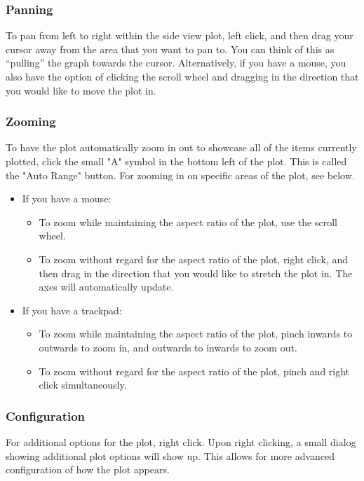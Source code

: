 \documentclass[titlepage]{article}
\begin{document}
	\subsubsection{Panning}
	To pan from left to right within the side view plot, left click, and then drag your cursor away from the area that you want to pan to. You can think of this as “pulling” the graph towards the cursor. Alternatively, if you have a mouse, you also have the option of clicking the scroll wheel and dragging in the direction that you would like to move the plot in.
	
	\subsubsection{Zooming}
	
	To have the plot automatically zoom in out to showcase all of the items currently plotted, click the small "A" symbol in the bottom left of the plot. This is called the "Auto Range" button. For zooming in on specific areas of the plot, see below.
	
	\begin{itemize}
		\item If you have a mouse:
			\begin{itemize}
				\item To zoom while maintaining the aspect ratio of the plot, use the scroll wheel.
				\item To zoom without regard for the aspect ratio of the plot, right click, and then drag in the direction that you would like to stretch the plot in. The axes will automatically update.
			\end{itemize}
	
		\item If you have a trackpad:
			\begin{itemize}
				\item To zoom while maintaining the aspect ratio of the plot, pinch inwards to outwards to zoom in, and outwards to inwards to zoom out.
				\item To zoom without regard for the aspect ratio of the plot, pinch and right click simultaneously. 
			\end{itemize}
	\end{itemize}

	\subsubsection{Configuration}
	For additional options for the plot, right click. Upon right clicking, a small dialog showing additional plot options will show up. This allows for more advanced configuration of how the plot appears.
	
\end{document}

